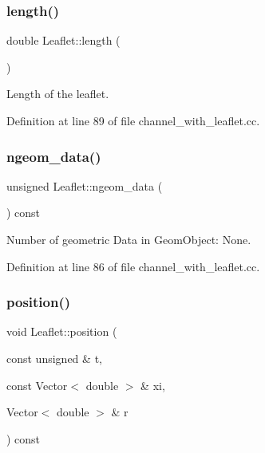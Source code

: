 \subsubsection{\texorpdfstring{length()}{length()}}
{\footnotesize\ttfamily double Leaflet\+::length (\begin{DoxyParamCaption}{ }\end{DoxyParamCaption})\hspace{0.3cm}{\ttfamily [inline]}}



Length of the leaflet. 



Definition at line 89 of file channel\+\_\+with\+\_\+leaflet.\+cc.

\mbox{\label{classLeaflet_a91f2460718ec5a4ef32e302b8b14cdca}} 
\subsubsection{\texorpdfstring{ngeom\+\_\+data()}{ngeom\_data()}}
{\footnotesize\ttfamily unsigned Leaflet\+::ngeom\+\_\+data (\begin{DoxyParamCaption}{ }\end{DoxyParamCaption}) const\hspace{0.3cm}{\ttfamily [inline]}}



Number of geometric Data in Geom\+Object\+: None. 



Definition at line 86 of file channel\+\_\+with\+\_\+leaflet.\+cc.

\mbox{\label{classLeaflet_a5b78c2735652b6a5c08c6aa9d38b6232}} 
\subsubsection{\texorpdfstring{position()}{position()}\hspace{0.1cm}{\footnotesize\ttfamily [1/2]}}
{\footnotesize\ttfamily void Leaflet\+::position (\begin{DoxyParamCaption}\item[{const unsigned \&}]{t,  }\item[{const Vector$<$ double $>$ \&}]{xi,  }\item[{Vector$<$ double $>$ \&}]{r }\end{DoxyParamCaption}) const\hspace{0.3cm}{\ttfamily [inline]}}



